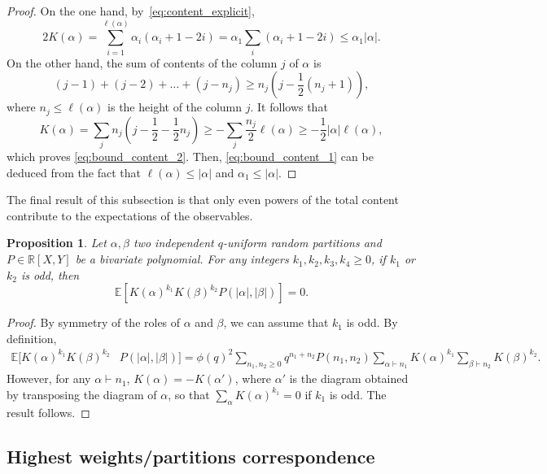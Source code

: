 \documentclass[11pt,a4paper,reqno]{article}
\newtheorem{proposition}[theorem]{Proposition}
\theoremstyle{definition}
\theoremstyle{remark}
\newcommand\R{\mathbb{R}}
\newcommand\E{\mathbb{E}}
\begin{document}
\begin{proof}
On the one hand, by~\eqref{eq:content_explicit},
\[
2K(\alpha)=\sum_{i=1}^{\ell(\alpha)}\alpha_i(\alpha_i+1-2i) =\alpha_1 \sum_i (\alpha_i+1-2i)\leq \alpha_1\vert\alpha\vert.
\]
On the other hand, the sum of contents of the column $j$ of $\alpha$ is
\[
(j-1)+(j-2)+\ldots+(j-n_j)\geq n_j\left(j-\frac12(n_j+1)\right),
\]
where $n_j\leq \ell(\alpha)$ is the height of the column $j$. It follows that
\[
K(\alpha)= \sum_j n_j\left(j-\frac12-\frac12n_j\right)\geq -\sum_j \frac{n_j}{2}\ell(\alpha)\geq -\frac12\vert\alpha\vert\ell(\alpha),
\]
which proves \eqref{eq:bound_content_2}. Then, \eqref{eq:bound_content_1} can be deduced from the fact that $\ell(\alpha)\leq \vert\alpha\vert$ and $\alpha_1\leq\vert\alpha\vert$.
\end{proof}

The final result of this subsection is that only even powers of the total content contribute to the expectations of the observables. 

\begin{proposition}\label{prop:symmetry_partitions}
Let $\alpha,\beta$ two independent $q$-uniform random partitions and $P\in\R[X,Y]$ be a bivariate polynomial. For any integers $k_1,k_2,k_3,k_4\geq 0$, if $k_1$ or $k_2$ is odd, then
\begin{equation}
\E[K(\alpha)^{k_1}K(\beta)^{k_2}P(\vert\alpha\vert,\vert\beta\vert)]=0.
\end{equation}
\end{proposition}

\begin{proof}
By symmetry of the roles of $\alpha$ and $\beta$, we can assume that $k_1$ is odd. By definition,
\begin{align*}
\E[K(\alpha)^{k_1}K(\beta)^{k_2}&P(\vert\alpha\vert,\vert\beta\vert)]= \phi(q)^2\sum_{n_1,n_2\geq 0}q^{n_1+n_2}P(n_1,n_2)\sum_{\alpha\vdash n_1}K(\alpha)^{k_1}\sum_{\beta\vdash n_2}K(\beta)^{k_2}.
\end{align*}
However, for any $\alpha\vdash n_1$, $K(\alpha)=-K(\alpha')$, where $\alpha'$ is the diagram obtained by transposing the diagram of $\alpha$, so that $\sum_\alpha K(\alpha)^{k_1}=0$ if $k_1$ is odd. The result follows.
\end{proof}

\subsection{Highest weights/partitions correspondence}\label{sec:hw_partition_corresp}
\end{document}
